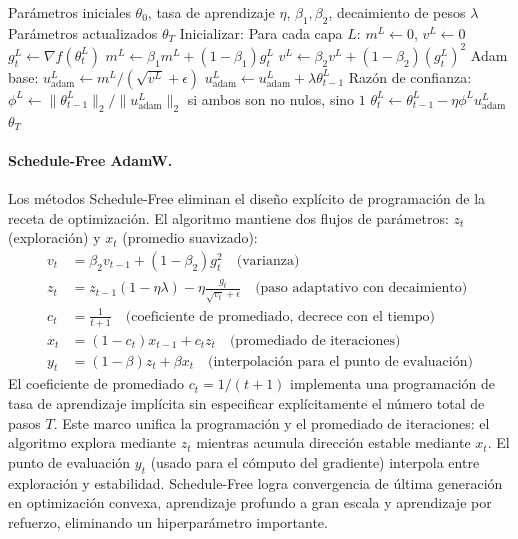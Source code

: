 \begin{algorithm}[H]
\caption{LAMB (Layer-wise Adaptive Moments optimizer for Batch training)}
\label{alg:lamb}
\begin{algorithmic}[1]
\Require Parámetros iniciales $\theta_0$, tasa de aprendizaje $\eta$, $\beta_1, \beta_2$, decaimiento de pesos $\lambda$
\Ensure Parámetros actualizados $\theta_T$
\State Inicializar: Para cada capa $L$: $m^L \gets 0$, $v^L \gets 0$
        \State $g_t^L \gets \nabla f(\theta_t^L)$
        \State $m^L \gets \beta_1 m^L + (1-\beta_1) g_t^L$
        \State $v^L \gets \beta_2 v^L + (1-\beta_2) (g_t^L)^2$
        \State Adam base: $u_{\text{adam}}^L \gets m^L / (\sqrt{v^L} + \epsilon)$
            \State $u_{\text{adam}}^L \gets u_{\text{adam}}^L + \lambda \theta_{t-1}^L$
        \EndIf
        \State Razón de confianza: $\phi^L \gets \|\theta_{t-1}^L\|_2 / \|u_{\text{adam}}^L\|_2$ si ambos son no nulos, sino $1$
        \State $\theta_t^L \gets \theta_{t-1}^L - \eta \phi^L u_{\text{adam}}^L$
    \EndFor
\EndFor
\Return $\theta_T$
\end{algorithmic}
\end{algorithm}

\paragraph{Schedule-Free AdamW.}
Los métodos Schedule-Free eliminan el diseño explícito de programación de la receta de optimización. El algoritmo mantiene dos flujos de parámetros: $z_t$ (exploración) y $x_t$ (promedio suavizado):
\begin{align}
v_t &= \beta_2 v_{t-1} + (1-\beta_2)g_t^2 \quad\text{(varianza)} \\
z_t &= z_{t-1}(1-\eta\lambda) - \eta\frac{g_t}{\sqrt{v_t}+\epsilon} \quad\text{(paso adaptativo con decaimiento)} \\
c_t &= \frac{1}{t+1} \quad\text{(coeficiente de promediado, decrece con el tiempo)} \\
x_t &= (1-c_t)x_{t-1} + c_t z_t \quad\text{(promediado de iteraciones)} \\
y_t &= (1-\beta)z_t + \beta x_t \quad\text{(interpolación para el punto de evaluación)}
\end{align}
El coeficiente de promediado $c_t = 1/(t+1)$ implementa una programación de tasa de aprendizaje implícita sin especificar explícitamente el número total de pasos $T$. Este marco unifica la programación y el promediado de iteraciones: el algoritmo explora mediante $z_t$ mientras acumula dirección estable mediante $x_t$. El punto de evaluación $y_t$ (usado para el cómputo del gradiente) interpola entre exploración y estabilidad. Schedule-Free logra convergencia de última generación en optimización convexa, aprendizaje profundo a gran escala y aprendizaje por refuerzo, eliminando un hiperparámetro importante.

